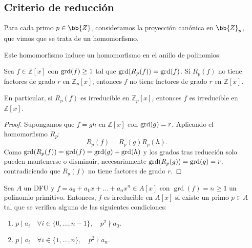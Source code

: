 \subsection{Criterio de reducción}

Para cada primo $p\in \bb{Z}$, consideramos la proyección canónica en $\bb{Z}_p$, que vimos que se trata de un homomorfismo.

Este homomorfismo induce un homomorfismo en el anillo de polinomios:

\begin{prop}
    Sea $f \in \mathbb{Z}[x]$ con $\operatorname{grd}(f) \geq 1$ tal que $\operatorname{grd}(R_p(f)) = \operatorname{grd}(f)$. Si $R_p(f)$ no tiene factores de grado $r$ en $\mathbb{Z}_p[x]$, entonces $f$ no tiene factores de grado $r$ en $\mathbb{Z}[x]$.

    En particular, si $R_p(f)$ es irreducible en $\mathbb{Z}_p[x]$, entonces $f$ es irreducible en $\mathbb{Z}[x]$.
\end{prop}

\begin{proof}
    Supongamos que $f = gh$ en $\mathbb{Z}[x]$ con $\operatorname{grd}(g) = r$. Aplicando el homomorfismo $R_p$:
    \[
        R_p(f) = R_p(g) R_p(h).
    \]
    Como $\operatorname{grd}(R_p(f)) = \operatorname{grd}(f) = \operatorname{grd}(g) + \operatorname{grd}(h)$ y los grados tras reducción solo pueden mantenerse o disminuir, necesariamente $\operatorname{grd}(R_p(g)) = \operatorname{grd}(g) = r$, contradiciendo que $R_p(f)$ no tiene factores de grado $r$.
\end{proof}





\begin{prop}
    Sea $A$ un DFU y $f = a_0 + a_1x + \dots + a_nx^n \in A[x]$ con $\operatorname{grd}(f) = n \geq 1$ un polinomio primitivo.
    Entonces, $f$ es irreducible en $A[x]$ si existe un primo $p \in A$ tal que se verifica alguna de las siguientes condiciones:
    \begin{enumerate}[label=\roman*)]
        \item $p \mid a_i \quad \forall i \in \{0, \dots, n-1\}, \quad p^2 \nmid a_0$.
        \item $p \mid a_i \quad \forall i \in \{1, \dots, n\}, \quad p^2 \nmid a_n$.
    \end{enumerate}
\end{prop}

